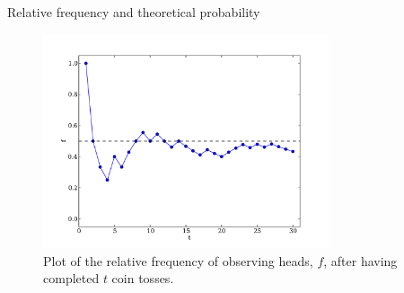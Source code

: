\begin{wex}{Relative frequency and theoretical probability}
{\begin{figure}[H]
  \begin{center}
    \includegraphics[width=0.75\textwidth]{Gr10-Probability-images/coin_toss_trials.pdf}
  \end{center}
  \caption{Plot of the relative frequency of observing heads, $f$,
    after having completed $t$ coin tosses.}
\end{figure}
}
\end{wex}


